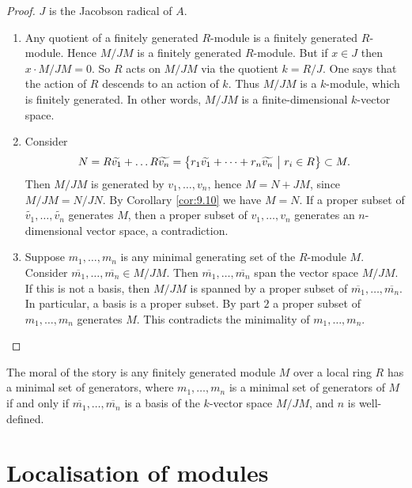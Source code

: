 \begin{proof}
$ J $ is the Jacobson radical of $ A $.
\begin{enumerate}
\item Any quotient of a finitely generated $ R $-module is a finitely generated $ R $-module. Hence $ M / JM $ is a finitely generated $ R $-module. But if $ x \in J $ then $ x \cdot M / JM = 0 $. So $ R $ acts on $ M / JM $ via the quotient $ k = R / J $. One says that the action of $ R $ descends to an action of $ k $. Thus $ M / JM $ is a $ k $-module, which is finitely generated. In other words, $ M / JM $ is a finite-dimensional $ k $-vector space.
\item Consider
$$ N = R\widetilde{v_1} + \dots R\widetilde{v_n} = \cbr{r_1\widetilde{v_1} + \dots + r_n\widetilde{v_n} \st r_i \in R} \subset M. $$
Then $ M / JM $ is generated by $ v_1, \dots, v_n $, hence $ M = N + JM $, since $ M / JM = N / JN $. By Corollary \ref{cor:9.10} we have $ M = N $. If a proper subset of $ \widetilde{v_1}, \dots, \widetilde{v_n} $ generates $ M $, then a proper subset of $ v_1, \dots, v_n $ generates an $ n $-dimensional vector space, a contradiction.


\item Suppose $ m_1, \dots, m_n $ is any minimal generating set of the $ R $-module $ M $. Consider $ \overline{m_1}, \dots, \overline{m_n} \in M / JM $. Then $ \overline{m_1}, \dots, \overline{m_n} $ span the vector space $ M / JM $. If this is not a basis, then $ M / JM $ is spanned by a proper subset of $ \overline{m_1}, \dots, \overline{m_n} $. In particular, a basis is a proper subset. By part $ 2 $ a proper subset of $ m_1, \dots, m_n $ generates $ M $. This contradicts the minimality of $ m_1, \dots, m_n $.
\end{enumerate}
\end{proof}

The moral of the story is any finitely generated module $ M $ over a local ring $ R $ has a minimal set of generators, where $ m_1, \dots, m_n $ is a minimal set of generators of $ M $ if and only if $ \overline{m_1}, \dots, \overline{m_n} $ is a basis of the $ k $-vector space $ M / JM $, and $ n $ is well-defined.

\pagebreak

\section{Localisation of modules}

